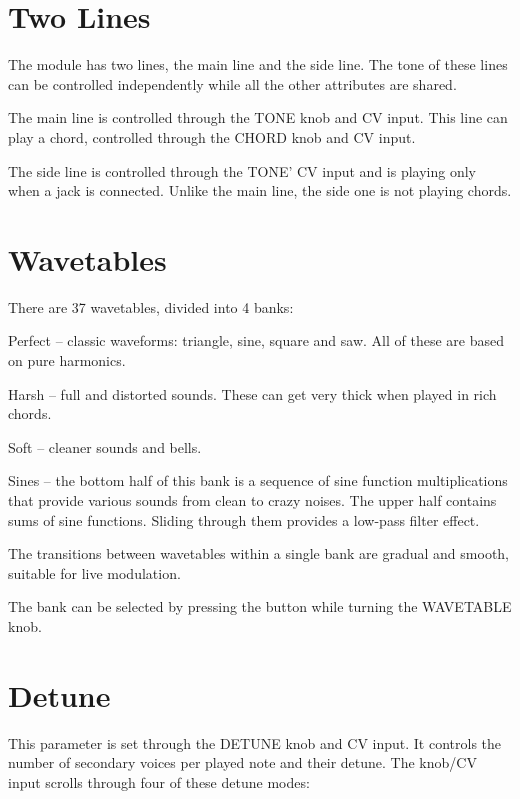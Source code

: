 \documentclass[10pt,nofoldmark,nocombine]{leaflet} %
\newenvironment{packed_enumerate_i}{
\begin{enumerate}[I]
  \setlength{\itemsep}{1pt}
  \setlength{\parskip}{0pt}
  \setlength{\parsep}{0pt}
}{\end{enumerate}}
\begin{document}
\section{Two Lines}

The module has two lines, the main line and the side line. The tone of these lines can be controlled independently while all the other attributes are shared.

The main line is controlled through the TONE knob and CV input. This line can play a chord, controlled through the CHORD knob and CV input.

The side line is controlled through the TONE' CV input and is playing only when a jack is connected. Unlike the main line, the side one is not playing chords.

\section{Wavetables}

There are 37 wavetables, divided into 4 banks:

\begin{packed_enumerate_i}
  \item Perfect -- classic waveforms: triangle, sine, square and saw. All of these are based on pure harmonics.
  \item Harsh -- full and distorted sounds. These can get very thick when played in rich chords.
  \item Soft -- cleaner sounds and bells.
  \item Sines -- the bottom half of this bank is a sequence of sine function multiplications that provide various sounds from clean to crazy noises. The upper half contains sums of sine functions. Sliding through them provides a low-pass filter effect.
\end{packed_enumerate_i}

The transitions between wavetables within a single bank are gradual and smooth, suitable for live modulation.

The bank can be selected by pressing the button while turning the WAVETABLE knob.

\section{Detune}

This parameter is set through the DETUNE knob and CV input. It controls the number of secondary voices per played note and their detune. The knob/CV input scrolls through four of these detune modes:
\end{document}
